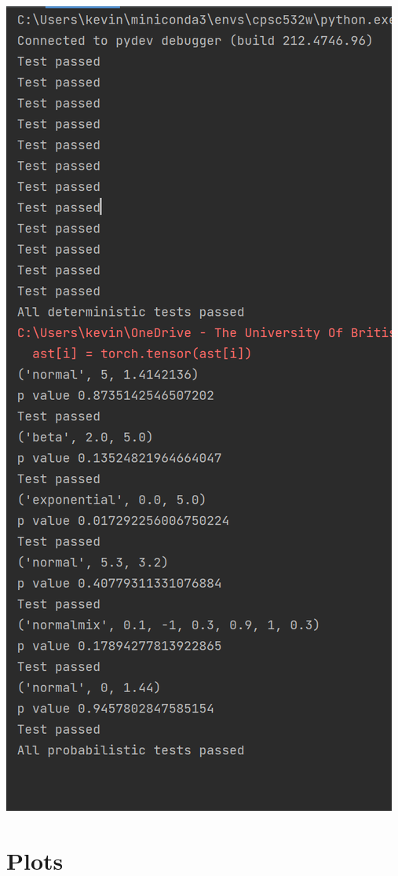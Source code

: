 \documentclass[10pt]{homeworg}
\begin{document}
\begin{center}
\includegraphics[scale=0.5]{figures/graph_unit_tests.png}
\end{center}


\section{Plots}
\end{document}
